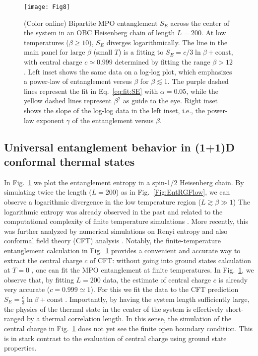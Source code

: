 \documentclass[aps,prx,twocolumn,showpacs,psfig,superscriptaddress,longbibliography]{revtex4-1}
\newcommand{\Eq}[1]{Eq.~\eqref{#1}}
\newcommand{\Fig}[1]{Fig.~\ref{#1}}
\begin{document}
\begin{figure}[tbp]
\texttt{[image: Fig8]}
\caption{(Color online)
   Bipartite MPO entanglement $S_E$ across the center of the
   system in an OBC Heisenberg chain of length $L=200$. At
   low temperatures ($\beta \geq 10$), $S_E$ diverges
   logarithmically.  The line in the main panel for large
   $\beta$ (small $T$) is a fitting to $S_E = c/3 \ln{\beta}
   + \mathrm{const}$, with central charge $c\simeq 0.999$
   determined by fitting the range $\beta > 12$.  Left inset
   shows the same data on a log-log plot, which emphasizes a
   power-law of entanglement versus $\beta$ for $\beta
   \lesssim 1$.  The purple dashed lines represent the fit in
   \Eq{eq:fit:SE} with $\alpha=0.05$, while the yellow dashed
   lines represent $\beta^{2}$ as guide to the eye.  Right
   inset shows the slope of the log-log data in the left
   inset, i.e., the power-law exponent $\gamma$ of the
   entanglement versus $\beta$.
}
\label{Fig:EntOpenChain}
\end{figure}


\subsection{Universal entanglement behavior in (1+1)D conformal
thermal states}

In Fig.~\ref{Fig:EntOpenChain} we plot the entanglement entropy in a
spin-1/2 Heisenberg chain.  By simulating twice the length ($L=200$)
as in \Fig{Fig:EntRGFlow}, we can observe a logarithmic divergence
in the low temperature region ($L \gtrsim \beta \gg 1$) The
logarithmic entropy was already observed in the past and related to
the computational complexity of finite temperature simulations
\cite{Prosen.t+:2007:Entropy,Marko.z+:2008:Complexity}.
%
More recently, this was further analyzed by numerical simulations on
Renyi entropy and also conformal field theory (CFT) analysis
\cite{Barthel.t:2017:FiniteT}.  Notably, the finite-temperature
entanglement calculation in \Fig{Fig:EntOpenChain} provides a
convenient and accurate way to extract the central charge $c$ of
CFT: without going into ground states calculation at $T=0$
\cite{Holzhey.c+:1994:RenormalizedEntropy, Calabrese09,Amico08}, one
can fit the MPO entanglement at finite temperatures. In
\Fig{Fig:EntOpenChain}, we observe that, by fitting $L=200$ data,
the estimate of central charge $c$ is already very accurate
($c=0.999 \simeq 1$).  For this we fit the data to the CFT
prediction $S_E=\tfrac{c}{3}\ln\beta + \mathrm{const}$
\cite{Barthel.t:2017:FiniteT}.  Importantly, by having the system
length sufficiently large, the physics of the thermal state in the
center of the system is effectively short-ranged by a thermal
correlation length. In this sense, the simulation of the central
charge in \Fig{Fig:EntOpenChain} does not yet see the finite open
boundary condition.  This is in stark contrast to the evaluation of
central charge using ground state properties.
\end{document}
